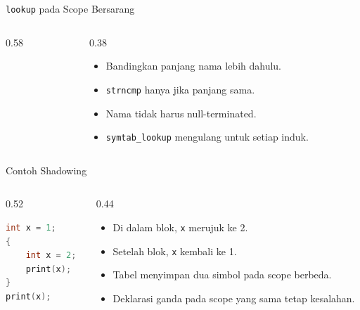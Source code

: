 \documentclass[aspectratio=169,10pt,t]{beamer}
\begin{document}
\begin{frame}[fragile]{\texttt{lookup} pada Scope Bersarang}
  \begin{columns}[T,onlytextwidth]
    \begin{column}{0.58\textwidth}
      
    \end{column}
    \begin{column}{0.38\textwidth}
      \begin{itemize}
        \item Bandingkan panjang nama lebih dahulu.
        \item \texttt{strncmp} hanya jika panjang sama.
        \item Nama tidak harus null-terminated.
        \item \texttt{symtab\_lookup} mengulang untuk setiap induk.
      \end{itemize}
    \end{column}
  \end{columns}
\end{frame}

\begin{frame}[fragile]{Contoh Shadowing}
  \begin{columns}[T,onlytextwidth]
    \begin{column}{0.52\textwidth}
      \begin{lstlisting}[language=C,numbers=none,
        caption={Dua simbol \texttt{x} pada scope berbeda}]
int x = 1;
{
    int x = 2;
    print(x);
}
print(x);
      \end{lstlisting}
    \end{column}
    \begin{column}{0.44\textwidth}
      \begin{itemize}
        \item Di dalam blok, \texttt{x} merujuk ke 2.
        \item Setelah blok, \texttt{x} kembali ke 1.
        \item Tabel menyimpan dua simbol pada scope berbeda.
        \item Deklarasi ganda pada scope yang sama tetap kesalahan.
      \end{itemize}
    \end{column}
  \end{columns}
\end{frame}
\end{document}
